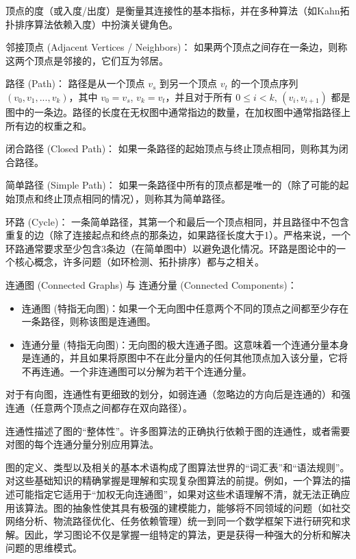 顶点的度（或入度/出度）是衡量其连接性的基本指标，并在多种算法（如Kahn拓扑排序算法依赖入度）中扮演关键角色。

邻接顶点 (Adjacent Vertices / Neighbors)： 如果两个顶点之间存在一条边，则称这两个顶点是邻接的，它们互为邻居。

路径 (Path)： 路径是从一个顶点 $v_s$ 到另一个顶点 $v_t$ 的一个顶点序列 $(v_0,v_1,...,v_k)$，其中 $v_0=v_s$, $v_k=v_t$，并且对于所有 $0 \leq i < k$, $(v_i,v_{i+1})$ 都是图中的一条边。路径的长度在无权图中通常指边的数量，在加权图中通常指路径上所有边的权重之和。

闭合路径 (Closed Path)： 如果一条路径的起始顶点与终止顶点相同，则称其为闭合路径。

简单路径 (Simple Path)： 如果一条路径中所有的顶点都是唯一的（除了可能的起始顶点和终止顶点相同的情况），则称其为简单路径。

环路 (Cycle)： 一条简单路径，其第一个和最后一个顶点相同，并且路径中不包含重复的边（除了连接起点和终点的那条边，如果路径长度大于1）。严格来说，一个环路通常要求至少包含3条边（在简单图中）以避免退化情况。环路是图论中的一个核心概念，许多问题（如环检测、拓扑排序）都与之相关。

连通图 (Connected Graphs) 与 连通分量 (Connected Components)：

\begin{itemize}
	\item 连通图 (特指无向图)：如果一个无向图中任意两个不同的顶点之间都至少存在一条路径，则称该图是连通图。
	\item 连通分量 (特指无向图)：无向图的极大连通子图。这意味着一个连通分量本身是连通的，并且如果将原图中不在此分量内的任何其他顶点加入该分量，它将不再连通。一个非连通图可以分解为若干个连通分量。
\end{itemize}

对于有向图，连通性有更细致的划分，如弱连通（忽略边的方向后是连通的）和强连通（任意两个顶点之间都存在双向路径）。

连通性描述了图的“整体性”。许多图算法的正确执行依赖于图的连通性，或者需要对图的每个连通分量分别应用算法。

图的定义、类型以及相关的基本术语构成了图算法世界的“词汇表”和“语法规则”。对这些基础知识的精确掌握是理解和实现复杂图算法的前提。例如，一个算法的描述可能指定它适用于“加权无向连通图”，如果对这些术语理解不清，就无法正确应用该算法。图的抽象性使其具有极强的建模能力，能够将不同领域的问题（如社交网络分析、物流路径优化、任务依赖管理）统一到同一个数学框架下进行研究和求解。因此，学习图论不仅是掌握一组特定的算法，更是获得一种强大的分析和解决问题的思维模式。

